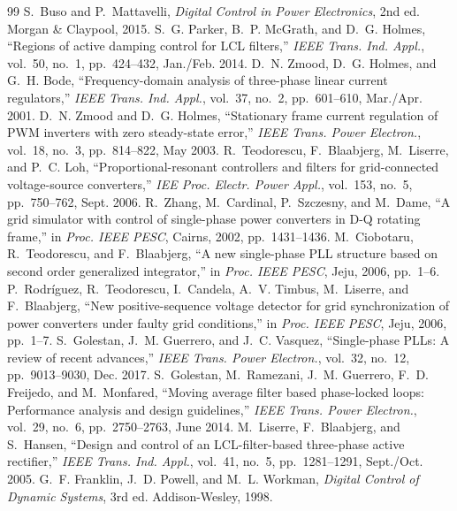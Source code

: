 \documentclass[10pt,a4paper]{scrartcl}
\begin{document}
\begin{onehalfspace}
\begin{thebibliography}{99}
\small
{} S.~Buso and P.~Mattavelli, \emph{Digital Control in Power Electronics}, 2nd ed. Morgan \& Claypool, 2015.
 S.~G. Parker, B.~P. McGrath, and D.~G. Holmes, ``Regions of active damping control for LCL filters,'' \emph{IEEE Trans. Ind. Appl.}, vol.~50, no.~1, pp.~424--432, Jan./Feb. 2014.
 D.~N. Zmood, D.~G. Holmes, and G.~H. Bode, ``Frequency-domain analysis of three-phase linear current regulators,'' \emph{IEEE Trans. Ind. Appl.}, vol.~37, no.~2, pp.~601--610, Mar./Apr. 2001.
 D.~N. Zmood and D.~G. Holmes, ``Stationary frame current regulation of PWM inverters with zero steady-state error,'' \emph{IEEE Trans. Power Electron.}, vol.~18, no.~3, pp.~814--822, May 2003.
 R.~Teodorescu, F.~Blaabjerg, M.~Liserre, and P.~C. Loh, ``Proportional-resonant controllers and filters for grid-connected voltage-source converters,'' \emph{IEE Proc. Electr. Power Appl.}, vol.~153, no.~5, pp.~750--762, Sept. 2006.
 R.~Zhang, M.~Cardinal, P.~Szczesny, and M.~Dame, ``A grid simulator with control of single-phase power converters in D-Q rotating frame,'' in \emph{Proc. IEEE PESC}, Cairns, 2002, pp.~1431--1436.
 M.~Ciobotaru, R.~Teodorescu, and F.~Blaabjerg, ``A new single-phase PLL structure based on second order generalized integrator,'' in \emph{Proc. IEEE PESC}, Jeju, 2006, pp.~1--6.
 P.~Rodr\'iguez, R.~Teodorescu, I.~Candela, A.~V. Timbus, M.~Liserre, and F.~Blaabjerg, ``New positive-sequence voltage detector for grid synchronization of power converters under faulty grid conditions,'' in \emph{Proc. IEEE PESC}, Jeju, 2006, pp.~1--7.
 S.~Golestan, J.~M. Guerrero, and J.~C. Vasquez, ``Single-phase PLLs: A review of recent advances,'' \emph{IEEE Trans. Power Electron.}, vol.~32, no.~12, pp.~9013--9030, Dec. 2017.
 S.~Golestan, M.~Ramezani, J.~M. Guerrero, F.~D. Freijedo, and M.~Monfared, ``Moving average filter based phase-locked loops: Performance analysis and design guidelines,'' \emph{IEEE Trans. Power Electron.}, vol.~29, no.~6, pp.~2750--2763, June 2014.
 M.~Liserre, F.~Blaabjerg, and S.~Hansen, ``Design and control of an LCL-filter-based three-phase active rectifier,'' \emph{IEEE Trans. Ind. Appl.}, vol.~41, no.~5, pp.~1281--1291, Sept./Oct. 2005.
 G.~F. Franklin, J.~D. Powell, and M.~L. Workman, \emph{Digital Control of Dynamic Systems}, 3rd ed. Addison-Wesley, 1998.
\end{thebibliography}

\end{onehalfspace}
\end{document}
